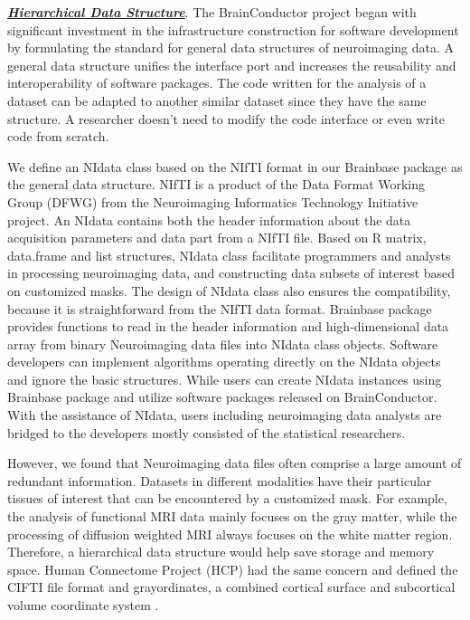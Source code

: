 \documentclass{nature}
\begin{document}
\underline{\textit{\textbf{Hierarchical Data Structure}}}. The BrainConductor project began with significant investment in the infrastructure construction for software development by formulating the standard for general data structures of neuroimaging data. A general data structure unifies the interface port and increases the reusability and interoperability of software packages. The code written for the analysis of a dataset can be adapted to another similar dataset since they have the same structure. A researcher doesn't need to modify the code interface or even write code from scratch.

We define an NIdata class based on the NIfTI format in our Brainbase package as the general data structure. NIfTI is a product of the Data Format Working Group (DFWG) from the Neuroimaging Informatics Technology Initiative project. An NIdata contains both the header information about the data acquisition parameters and data part from a NIfTI file. Based on R matrix, data.frame and list structures, NIdata class facilitate programmers and analysts in processing neuroimaging data, and constructing data subsets of interest based on customized masks. The design of NIdata class also ensures the compatibility, because it is straightforward from the NIfTI data format. Brainbase package provides functions to read in the header information and high-dimensional data array from binary Neuroimaging data files into NIdata class objects. Software developers can  implement algorithms operating directly on the NIdata objects and ignore the basic structures. While users can create NIdata instances using Brainbase package and utilize software packages released on BrainConductor. With the assistance of NIdata, users including neuroimaging data analysts are bridged to the developers mostly consisted of the statistical researchers.  

However, we found that Neuroimaging data files often comprise a large amount of redundant information. Datasets in different modalities have their particular tissues of interest that can be encountered by a customized mask. For example, the analysis of functional MRI data mainly focuses on the gray matter, while the processing of diffusion weighted MRI always focuses on the white matter region. Therefore, a hierarchical data structure would help save storage and memory space. Human Connectome Project (HCP) had the same concern and defined the CIFTI file format and grayordinates, a combined cortical surface and subcortical volume coordinate system \cite{Glasser2013The}. 
\end{document}
